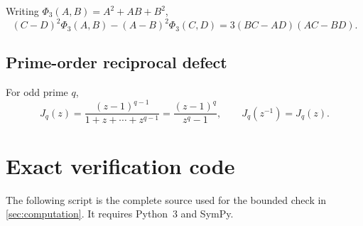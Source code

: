 \documentclass[11pt]{article}
\theoremstyle{definition}
\theoremstyle{remark}
\begin{document}
Writing $\Phi_3(A,B)=A^2+AB+B^2$,
\[
 (C-D)^2\Phi_3(A,B)-(A-B)^2\Phi_3(C,D)
 =3(BC-AD)(AC-BD).
\]

\subsection{Prime-order reciprocal defect}

For odd prime $q$,
\[
 J_q(z)=\frac{(z-1)^{q-1}}{1+z+\cdots+z^{q-1}}
 =\frac{(z-1)^q}{z^q-1},
 \qquad J_q(z^{-1})=J_q(z).
\]

\section{Exact verification code}
\label{app:code}

The following script is the complete source used for the bounded check in \cref{sec:computation}.  It requires Python~3 and SymPy.
\end{document}

